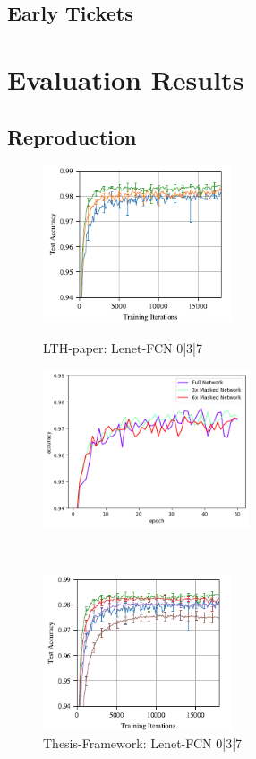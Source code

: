 \subsection*{Early Tickets}




\section{Evaluation Results}
\subsection*{Reproduction}
\begin{figure}
	\begin{minipage}{0.5\textwidth}
		\centering
		\includegraphics[height=175px]{gfx/7-Evaluation/LTH_1.png}
		\caption*{LTH-paper: Lenet-FCN 0|3|7}
		\label{?}
	\end{minipage}\hfill
	\begin{minipage}{0.5\textwidth}
		\centering
		\includegraphics[height=175px]{gfx/Experiments/Reproduction-MNIST-FCN/accuracy/LTH_1.png}
		\caption*{Thesis-Framework: Lenet-FCN 0|3|7}
		\label{?}
	\end{minipage}
	\\[10pt]
	\begin{minipage}{0.5\textwidth}
		\centering
		\includegraphics[height=175px]{gfx/7-Evaluation/LTH_2.png}

\end{minipage}
\end{figure}
